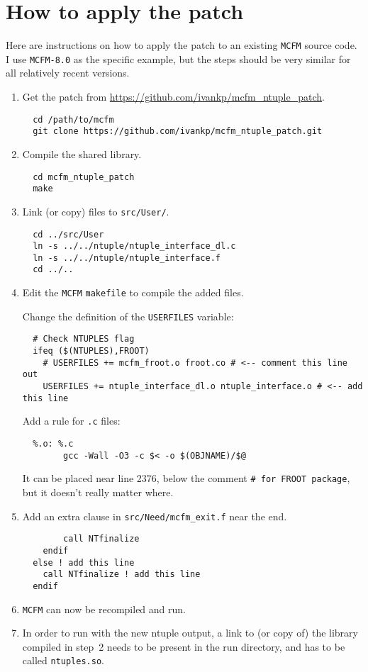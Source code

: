\documentclass[12pt]{article}
\begin{document}
\section{How to apply the patch}

Here are instructions on how to apply the patch to an existing \texttt{MCFM}
source code.
I use \texttt{MCFM-8.0} as the specific example, but the steps should be very
similar for all relatively recent versions.

\begin{enumerate}
\item Get the patch from \url{https://github.com/ivankp/mcfm_ntuple_patch}.
\begin{verbatim}
  cd /path/to/mcfm
  git clone https://github.com/ivankp/mcfm_ntuple_patch.git
\end{verbatim}

\item Compile the shared library.
\begin{verbatim}
  cd mcfm_ntuple_patch
  make
\end{verbatim}

\item Link (or copy) files to \texttt{src/User/}.
\begin{verbatim}
  cd ../src/User
  ln -s ../../ntuple/ntuple_interface_dl.c
  ln -s ../../ntuple/ntuple_interface.f
  cd ../..
\end{verbatim}

\item Edit the \texttt{MCFM} \texttt{makefile} to compile the added files.

Change the definition of the \texttt{USERFILES} variable:
\begin{verbatim}
  # Check NTUPLES flag
  ifeq ($(NTUPLES),FROOT)
    # USERFILES += mcfm_froot.o froot.co # <-- comment this line out
    USERFILES += ntuple_interface_dl.o ntuple_interface.o # <-- add this line
\end{verbatim}

Add a rule for \texttt{.c} files:
\begin{verbatim}
  %.o: %.c
        gcc -Wall -O3 -c $< -o $(OBJNAME)/$@
\end{verbatim}
It can be placed near line 2376, below the comment
\texttt{# for FROOT package}, but it doesn't really matter where.

\item Add an extra clause in \texttt{src/Need/mcfm\_exit.f} near the end.
\begin{verbatim}
        call NTfinalize
    endif
  else ! add this line
    call NTfinalize ! add this line
  endif
\end{verbatim}

\item \texttt{MCFM} can now be recompiled and run.
\item
  In order to run with the new ntuple output, a link to (or copy of)
  the library compiled in step~2 needs to be present in the run directory,
  and has to be called \texttt{ntuples.so}.
\end{enumerate}
\end{document}
